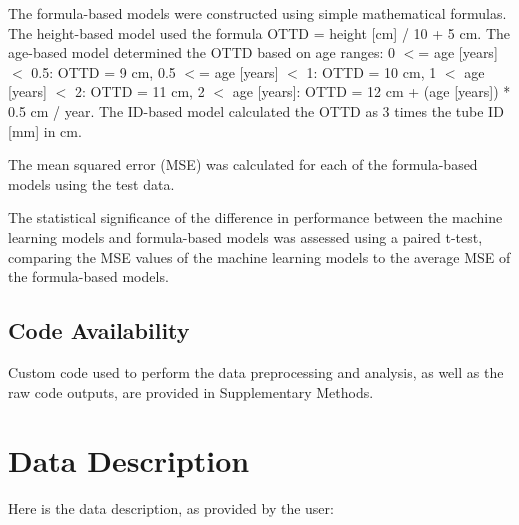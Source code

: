 \documentclass[11pt]{article}
\begin{document}
The formula-based models were constructed using simple mathematical formulas. The height-based model used the formula OTTD = height [cm] / 10 + 5 cm. The age-based model determined the OTTD based on age ranges: 0 $<$= age [years] $<$ 0.5: OTTD = 9 cm, 0.5 $<$= age [years] $<$ 1: OTTD = 10 cm, 1 $<$ age [years] $<$ 2: OTTD = 11 cm, 2 $<$ age [years]: OTTD = 12 cm + (age [years]) * 0.5 cm / year. The ID-based model calculated the OTTD as 3 times the tube ID [mm] in cm.

The mean squared error (MSE) was calculated for each of the formula-based models using the test data.

The statistical significance of the difference in performance between the machine learning models and formula-based models was assessed using a paired t-test, comparing the MSE values of the machine learning models to the average MSE of the formula-based models.\subsection*{Code Availability}

Custom code used to perform the data preprocessing and analysis, as well as the raw code outputs, are provided in Supplementary Methods.


\clearpage
\appendix

\section{Data Description} \label{sec:data_description} Here is the data description, as provided by the user:
\end{document}
